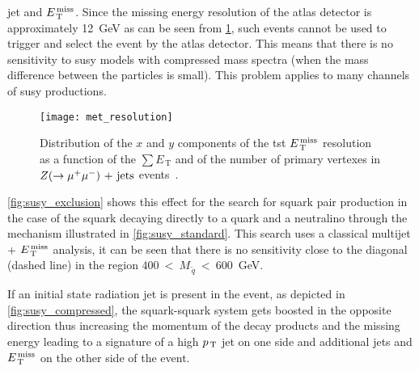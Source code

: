 jet and $E_\mathrm{\, T}^\mathrm{\, miss}$. Since the missing energy resolution of the \gls{atlas} detector
is approximately 12~GeV as can be seen from \cref{fig:met_resolution}, such
events cannot be used to trigger and select the event by the \gls{atlas}
detector. This means that there is no sensitivity to \gls{susy} models with
compressed mass spectra (when the mass difference between the particles is
small). This problem applies to many channels of \gls{susy} productions.
\begin{figure}[!h]
  \centering
  \texttt{[image: met\_resolution]}
  \caption{Distribution of the $x$ and $y$ components of the \gls{tst} $E_\mathrm{\, T}^\mathrm{\, miss}$
    resolution as a function of the $\sum E_\mathrm{\, T}$ and of the number of
    primary vertexes in $Z (\rightarrow \mu^+ \mu^-)\mathrm{~+~jets}$ events~\cite{METResolution}.}
  \label{fig:met_resolution}
\end{figure}

\cref{fig:susy_exclusion} shows this effect for the search for squark pair
production in the case of the squark decaying directly to a quark and a
neutralino through the mechanism illustrated in \cref{fig:susy_standard}. This
search uses a classical multijet + $E_\mathrm{\, T}^\mathrm{\, miss}$ analysis, it can be seen that there is
no sensitivity close to the diagonal (dashed line) in the region
$400~<~M_{\, \tilde{q}}~<~600$~GeV.

If an initial state radiation jet is present in the event, as depicted in
\cref{fig:susy_compressed}, the squark-squark system gets boosted in the
opposite direction thus increasing the momentum of the decay products and the
missing energy leading to a signature of a high $p_\mathrm{\, T}$ jet on one side and
additional jets and $E_\mathrm{\, T}^\mathrm{\, miss}$ on the other side of the event.

